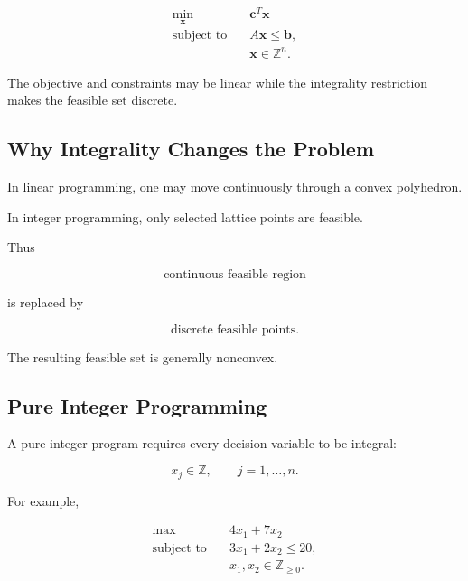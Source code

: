 \[
\boxed{
\begin{aligned}
\min_{\mathbf{x}}
\quad&
\mathbf{c}^T\mathbf{x}
\\
\text{subject to}
\quad&
A\mathbf{x}\leq\mathbf{b},
\\
&
\mathbf{x}\in\mathbb{Z}^n.
\end{aligned}
}
\]

The objective and constraints may be linear while the integrality
restriction makes the feasible set discrete.

\subsection{Why Integrality Changes the Problem}
\label{subsec:why-integrality-changes-problem}

In linear programming, one may move continuously through a convex
polyhedron.

In integer programming, only selected lattice points are feasible.

Thus

\[
\boxed{
\text{continuous feasible region}
}
\]

is replaced by

\[
\boxed{
\text{discrete feasible points}.
}
\]

The resulting feasible set is generally nonconvex.

\subsection{Pure Integer Programming}
\label{subsec:pure-integer-programming}

A pure integer program requires every decision variable to be integral:

\[
\boxed{
x_j\in\mathbb{Z},
\qquad
j=1,\ldots,n.
}
\]

For example,

\[
\boxed{
\begin{aligned}
\max
\quad&
4x_1+7x_2
\\
\text{subject to}
\quad&
3x_1+2x_2\leq20,
\\
&
x_1,x_2\in\mathbb{Z}_{\geq0}.
\end{aligned}
}
\]

